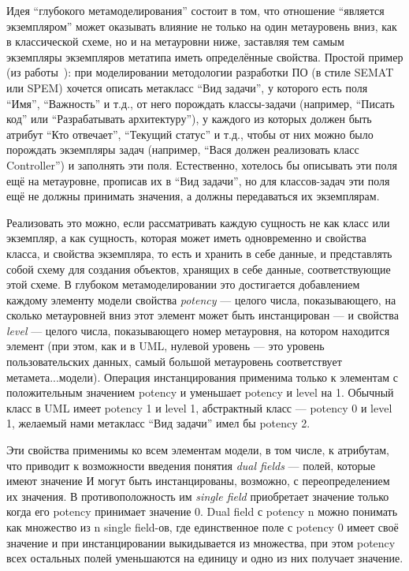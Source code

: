 \documentclass[a5paper]{article}
\begin{document}
Идея ``глубокого метамоделирования'' состоит в том, что отношение ``является экземпляром'' может оказывать влияние не только на один метауровень вниз, как в классической схеме, но и на метауровни ниже, заставляя тем самым экземпляры экземпляров метатипа иметь определённые свойства. Простой пример (из работы~\cite{gonzalez2006powertype}): при моделировании методологии разработки ПО (в стиле SEMAT или SPEM) хочется описать метакласс ``Вид задачи'', у которого есть поля ``Имя'', ``Важность'' и т.д., от него порождать классы-задачи (например, ``Писать код'' или ``Разрабатывать архитектуру''), у каждого из которых должен быть атрибут ``Кто отвечает'', ``Текущий статус'' и т.д., чтобы от них можно было порождать экземпляры задач (например, ``Вася должен реализовать класс Controller'') и заполнять эти поля. Естественно, хотелось бы описывать эти поля ещё на метауровне, прописав их в ``Вид задачи'', но для классов-задач эти поля ещё не должны принимать значения, а должны передаваться их экземплярам.

Реализовать это можно, если рассматривать каждую сущность не как класс или экземпляр, а как сущность, которая может иметь одновременно и свойства класса, и свойства экземпляра, то есть и хранить в себе данные, и представлять собой схему для создания объектов, хранящих в себе данные, соответствующие этой схеме. В глубоком метамоделировании это достигается добавлением каждому элементу модели свойства \textit{potency} --- целого числа, показывающего, на сколько метауровней вниз этот элемент может быть инстанцирован --- и свойства \textit{level} --- целого числа, показывающего номер метауровня, на котором находится элемент (при этом, как и в UML, нулевой уровень --- это уровень пользовательских данных, самый большой метауровень соответствует метамета...модели). Операция инстанцирования применима только к элементам с положительным значением potency и уменьшает potency и level на 1. Обычный класс в UML имеет potency 1 и level 1, абстрактный класс --- potency 0 и level 1, желаемый нами метакласс ``Вид задачи'' имел бы potency 2.

Эти свойства применимы ко всем элементам модели, в том числе, к атрибутам, что приводит к возможности введения понятия \textit{dual fields} --- полей, которые имеют значение И могут быть инстанцированы, возможно, с переопределением их значения. В противоположность им \textit{single field} приобретает значение только когда его potency принимает значение 0. Dual field с potency n можно понимать как множество из n single field-ов, где единственное поле с potency 0 имеет своё значение и при инстанцировании выкидывается из множества, при этом potency всех остальных полей уменьшаются на единицу и одно из них получает значение.
\end{document}
